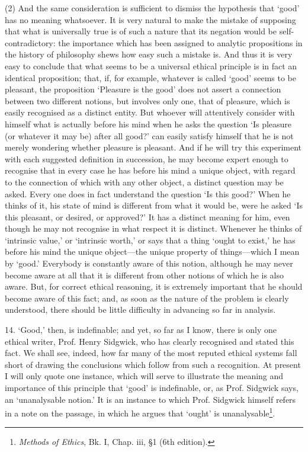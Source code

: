 (2) And the same consideration is sufficient to dismiss the hypothesis
that `good' has no meaning whatsoever. It is very natural to make the
mistake of supposing that what is universally true is of such a nature
that its negation would be self-contradictory: the importance which
has been assigned to analytic propositions in the history of
philosophy shews how easy such a mistake is. And thus it is very easy
to conclude that what seems to be a universal ethical principle is in
fact an identical proposition; that, if, for example, whatever is
called `good' seems to be pleasant, the proposition `Pleasure is the
good' does not assert a connection between two different notions, but
involves only one, that of pleasure, which is easily recognised as a
distinct entity. But whoever will attentively consider with himself
what is actually before his mind when he asks the question `Is
pleasure (or whatever it may be) after all good?' can easily satisfy
himself that he is not merely wondering whether pleasure is pleasant.
And if he will try this experiment with each suggested definition in
succession, he may become expert enough to recognise that in every
case he has before his mind a unique object, with regard to the
connection of which with any other object, a distinct question may be
asked. Every  one does in fact understand the question `Is
this good?' When he thinks of it, his state of mind is different from
what it would be, were he asked `Is this pleasant, or desired, or
approved?' It has a distinct meaning for him, even though he may not
recognise in what respect it is distinct. Whenever he thinks of
`intrinsic value,' or `intrinsic worth,' or says that a thing `ought
to exist,' he has before his mind the unique object---the unique
property of things---which I mean by `good.' Everybody is constantly
aware of this notion, although he may never become aware at all that
it is different from other notions of which he is also aware. But, for
correct ethical reasoning, it is extremely important that he should
become aware of this fact; and, as soon as the nature of the problem
is clearly understood, there should be little difficulty in advancing
so far in analysis.

14. `Good,' then, is indefinable; and yet, so far as I know, there is
only one ethical writer, Prof. Henry Sidgwick, who has clearly
recognised and stated this fact. We shall see, indeed, how far many of
the most reputed ethical systems fall short of drawing the conclusions
which follow from such a recognition. At present I will only quote one
instance, which will serve to illustrate the meaning and importance of
this principle that `good' is indefinable, or, as Prof. Sidgwick says,
an `unanalysable notion.' It is an instance to which Prof. Sidgwick
himself refers in a note on the passage, in which he argues that
`ought' is unanalysable\footnote{\textit{Methods of Ethics}, Bk. I,
Chap. iii, \S1 (6th edition).}.

